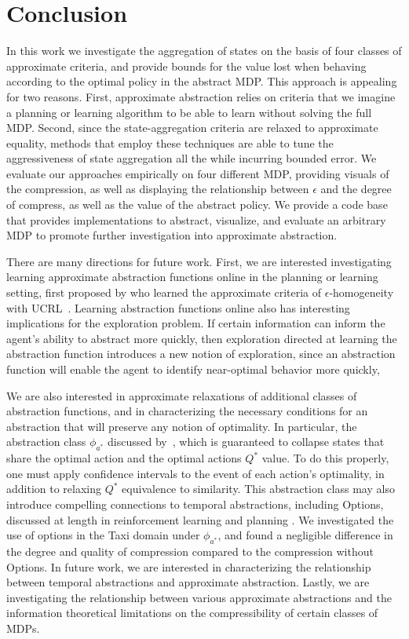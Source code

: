 \section{Conclusion}

In this work we investigate the aggregation of states on the basis of four classes of approximate criteria, and provide bounds for the value lost when behaving according to the optimal policy in the abstract \ac{MDP}. This approach is appealing for two reasons. First, approximate abstraction relies on criteria that we imagine a planning or learning algorithm to be able to learn without solving the full \ac{MDP}. Second, since the state-aggregation criteria are relaxed to approximate equality, methods that employ these techniques are able to tune the aggressiveness of state aggregation all the while incurring bounded error. We evaluate our approaches empirically on four different \acs{MDP}, providing visuals of the compression, as well as displaying the relationship between $\epsilon$ and the degree of compress, as well as the value of the abstract policy. We provide a code base that provides implementations to abstract, visualize, and evaluate an arbitrary MDP to promote further investigation into approximate abstraction.

There are many directions for future work. First, we are interested investigating learning approximate abstraction functions online in the planning or learning setting, first proposed by \citeauthor{ortner2013adaptive} who learned the approximate criteria of $\epsilon$-homogeneity with UCRL~\cite{ortner2007logarithmic}. Learning abstraction functions online also has interesting implications for the exploration problem. If certain information can inform the agent's ability to abstract more quickly, then exploration directed at learning the abstraction function introduces a new notion of exploration, since an abstraction function will enable the agent to identify near-optimal behavior more quickly, 

We are also interested in approximate relaxations of additional classes of abstraction functions, and in characterizing the necessary conditions for an abstraction that will preserve any notion of optimality. In particular, the abstraction class $\phi_{a^*}$ discussed by~\cite{li2006towards}, which is guaranteed to collapse states that share the optimal action and the optimal actions $Q^*$ value. To do this properly, one must apply confidence intervals to the event of each action's optimality, in addition to relaxing $Q^*$ equivalence to similarity. This abstraction class may also introduce compelling connections to temporal abstractions, including Options, discussed at length in reinforcement learning and planning . We investigated the use of options in the Taxi domain under $\phi_{a^*}$, and found a negligible difference in the degree and quality of compression compared to the compression without Options. In future work, we are interested in characterizing the relationship between temporal abstractions and approximate abstraction. Lastly, we are investigating the relationship between various approximate abstractions and the information theoretical limitations on the compressibility of certain classes of \acp{MDP}.


